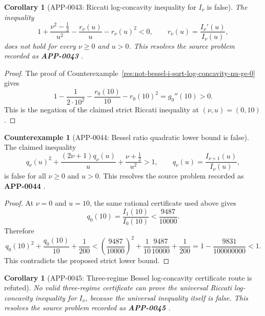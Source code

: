 \documentclass[11pt]{article}
\numberwithin{equation}{section}
\newtheorem{corollary}[theorem]{Corollary}
\theoremstyle{definition}
\newtheorem{counterexample}[theorem]{Counterexample}
\theoremstyle{remark}
\newcommand{\1}{\mathbf 1}
\begin{document}
\begin{corollary}[APP-0043: Riccati log-concavity inequality for \(I_\nu\) is false]
\label{res:not-bessel-i-riccati-log-concavity-inequality}
The inequality
\[
1+\frac{\nu^2-\frac12}{u^2}-\frac{r_\nu(u)}{u}-r_\nu(u)^2<0,
\qquad r_\nu(u)=\frac{I_\nu'(u)}{I_\nu(u)},
\]
does not hold for every \(\nu\ge0\) and \(u>0\).  This resolves the source problem recorded as \textbf{APP-0043} \cite{app-app-0042-source}.
\end{corollary}

\begin{proof}
The proof of Counterexample~\ref{res:not-bessel-i-sqrt-log-concavity-nu-ge-0} gives
\[
1-\frac{1}{2\cdot10^2}-\frac{r_0(10)}{10}-r_0(10)^2
=g_0''(10)>0.
\]
This is the negation of the claimed strict Riccati inequality at \((\nu,u)=(0,10)\).
\end{proof}

\begin{counterexample}[APP-0044: Bessel ratio quadratic lower bound is false]
\label{res:not-bessel-i-ratio-quadratic-bound}
The claimed inequality
\[
q_\nu(u)^2+\frac{(2\nu+1)q_\nu(u)}{u}+\frac{\nu+\frac12}{u^2}>1,
\qquad q_\nu(u)=\frac{I_{\nu+1}(u)}{I_\nu(u)},
\]
is false for all \(\nu\ge0\) and \(u>0\).  This resolves the source problem recorded as \textbf{APP-0044} \cite{app-app-0042-source}.
\end{counterexample}

\begin{proof}
At \(\nu=0\) and \(u=10\), the same rational certificate used above gives
\[
q_0(10)=\frac{I_1(10)}{I_0(10)}<\frac{9487}{10000}.
\]
Therefore
\[
q_0(10)^2+\frac{q_0(10)}{10}+\frac1{200}
<
\left(\frac{9487}{10000}\right)^2
+\frac1{10}\frac{9487}{10000}
+\frac1{200}
=1-\frac{9831}{100000000}<1.
\]
This contradicts the proposed strict lower bound.
\end{proof}

\begin{corollary}[APP-0045: Three-regime Bessel log-concavity certificate route is refuted]
\label{res:not-bessel-i-split-regime-log-concavity-certificate}
No valid three-regime certificate can prove the universal Riccati log-concavity inequality for \(I_\nu\), because the universal inequality itself is false.  This resolves the source problem recorded as \textbf{APP-0045} \cite{app-app-0042-source}.
\end{corollary}
\end{document}
